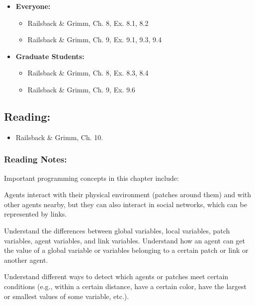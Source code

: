 \documentclass[]{article}
\providecommand{\tightlist}{%
  \setlength{\itemsep}{0pt}\setlength{\parskip}{0pt}}
\begin{document}
\begin{itemize}
\tightlist
\item
  \textbf{Everyone:}

  \begin{itemize}
  \tightlist
  \item
    Railsback \& Grimm, Ch. 8, Ex. 8.1, 8.2
  \item
    Railsback \& Grimm, Ch. 9, Ex. 9.1, 9.3, 9.4
  \end{itemize}
\item
  \textbf{Graduate Students:}

  \begin{itemize}
  \tightlist
  \item
    Railsback \& Grimm, Ch. 8, Ex. 8.3, 8.4
  \item
    Railsback \& Grimm, Ch. 9, Ex. 9.6
  \end{itemize}
\end{itemize}

\hypertarget{reading-10}{%
\subsection{Reading:}\label{reading-10}}

\begin{itemize}
\tightlist
\item
  Railsback \& Grimm, Ch. 10.
\end{itemize}

\hypertarget{reading-notes-9}{%
\subsubsection{Reading Notes:}\label{reading-notes-9}}

Important programming concepts in this chapter include:

\begin{description}
\tightlist
\item[Links:]
Agents interact with their physical environment (patches around them)
and with other agents nearby, but they can also interact in social
networks, which can be represented by links.
\item[Variable scope:]
Understand the differences between global variables, local variables,
patch variables, agent variables, and link variables. Understand how an
agent can get the value of a global variable or variables belonging to a
certain patch or link or another agent.
\item[Entity detection:]
Understand different ways to detect which agents or patches meet certain
conditions (e.g., within a certain distance, have a certain color, have
the largest or smallest values of some variable, etc.).
\end{description}
\end{document}
